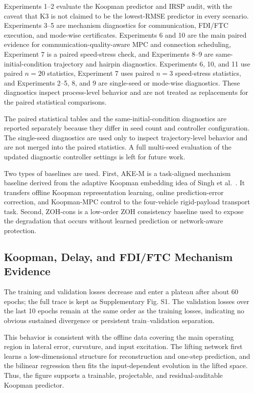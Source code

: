 \documentclass[twocolumn,3p,times,procedia]{elsarticle}
\newcommand{\AKE}{AKE-M}
\newcommand{\ZOHcons}{ZOH-cons}
\begin{document}
Experiments 1--2 evaluate the Koopman predictor and IRSP audit, with the caveat that K3 is not claimed to be the lowest-RMSE predictor in every scenario. Experiments 3--5 are mechanism diagnostics for communication, FDI/FTC execution, and mode-wise certificates. Experiments 6 and 10 are the main paired evidence for communication-quality-aware MPC and connection scheduling, Experiment 7 is a paired speed-stress check, and Experiments 8--9 are same-initial-condition trajectory and hairpin diagnostics. Experiments 6, 10, and 11 use paired $n=20$ statistics, Experiment 7 uses paired $n=3$ speed-stress statistics, and Experiments 2--5, 8, and 9 are single-seed or mode-wise diagnostics. These diagnostics inspect process-level behavior and are not treated as replacements for the paired statistical comparisons.

The paired statistical tables and the same-initial-condition diagnostics are reported separately because they differ in seed count and controller configuration. The single-seed diagnostics are used only to inspect trajectory-level behavior and are not merged into the paired statistics. A full multi-seed evaluation of the updated diagnostic controller settings is left for future work.

Two types of baselines are used. First, \AKE{} is a task-aligned mechanism baseline derived from the adaptive Koopman embedding idea of Singh et al.~\cite{singh2025adaptiveKoopman}. It transfers offline Koopman representation learning, online prediction-error correction, and Koopman-MPC control to the four-vehicle rigid-payload transport task. Second, \ZOHcons{} is a low-order ZOH consistency baseline used to expose the degradation that occurs without learned prediction or network-aware protection.

\subsection{Koopman, Delay, and FDI/FTC Mechanism Evidence}

The training and validation losses decrease and enter a plateau after about 60 epochs; the full trace is kept as Supplementary Fig. S1. The validation losses over the last 10 epochs remain at the same order as the training losses, indicating no obvious sustained divergence or persistent train--validation separation.

This behavior is consistent with the offline data covering the main operating region in lateral error, curvature, and input excitation. The lifting network first learns a low-dimensional structure for reconstruction and one-step prediction, and the bilinear regression then fits the input-dependent evolution in the lifted space. Thus, the figure supports a trainable, projectable, and residual-auditable Koopman predictor.
\end{document}
